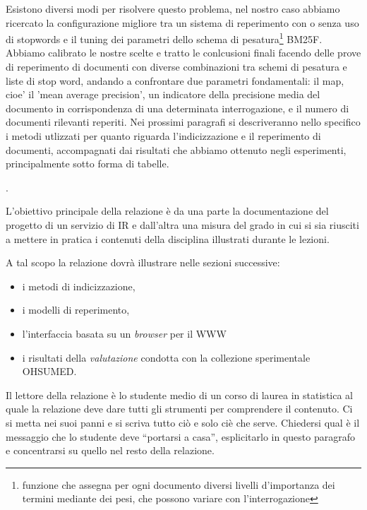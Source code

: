 \documentclass[runningheads]{llncs}
\begin{document}
Esistono diversi modi per risolvere questo problema, nel nostro caso abbiamo ricercato la configurazione migliore tra un sistema di
reperimento con o senza uso di stopwords e il tuning dei parametri dello schema di pesatura\footnote{funzione che assegna per ogni documento diversi livelli d’importanza dei termini mediante dei pesi, che possono variare con l’interrogazione} BM25F.
Abbiamo calibrato le nostre scelte e tratto le conlcusioni finali facendo delle prove di reperimento di documenti con diverse combinazioni tra schemi di pesatura e liste di stop word, andando a confrontare due parametri fondamentali: il map, cioe' il 'mean average precision', un indicatore della precisione media del documento in corrispondenza di una determinata interrogazione, e il numero di documenti rilevanti reperiti.
Nei prossimi paragrafi si descriveranno nello specifico i metodi utlizzati per quanto riguarda l'indicizzazione e il reperimento di documenti, accompagnati dai risultati che abbiamo ottenuto negli esperimenti, principalmente sotto forma di tabelle.

\cite{WBC}.




L'obiettivo principale della relazione \`e da una parte la
documentazione del progetto di un servizio di {IR} e dall'altra una
misura del grado in cui si sia riusciti a mettere in pratica i
contenuti della disciplina illustrati durante le lezioni.

A tal scopo la relazione dovr\`a illustrare nelle sezioni successive:
\begin{itemize}
\item i metodi di indicizzazione,
\item i modelli di reperimento,
\item l'interfaccia basata su un \textit{browser} per il {WWW}
\item i risultati della \emph{valutazione} condotta con la collezione
  sperimentale OHSUMED.
\end{itemize}
Il lettore della relazione \`e lo studente medio di un corso di laurea
in statistica al quale la relazione deve dare tutti gli strumenti per
comprendere il contenuto.  Ci si metta nei suoi panni e si scriva
tutto ci\`o e solo ci\`e che serve.  Chiedersi qual \`e il messaggio
che lo studente deve ``portarsi a casa'', esplicitarlo in questo
paragrafo e concentrarsi su quello nel resto della relazione.
\end{document}
